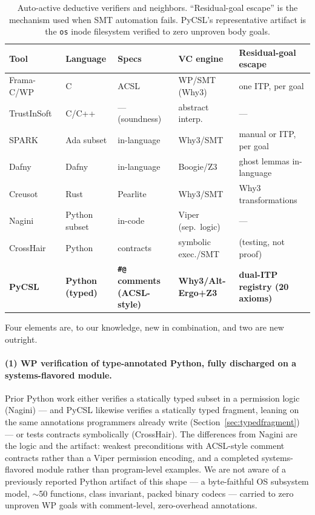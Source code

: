 \documentclass[11pt]{article}
\newcommand{\pycsl}{\textsf{PyCSL}}
\newcommand{\why}{\textsf{Why3}}
\newcommand{\altergo}{\textsf{Alt-Ergo}}
\newcommand{\zthree}{\textsf{Z3}}
\newcommand{\osmod}{\texttt{os}}
\begin{document}
\begin{table}[t]
\centering
\footnotesize
\setlength{\tabcolsep}{4pt}
\renewcommand{\arraystretch}{1.15}
\begin{tabularx}{\textwidth}{@{}l l X l X@{}}
\toprule
Tool & Language & Specs & VC engine & Residual-goal escape \\
\midrule
Frama-C/WP~\cite{framac} & C & ACSL & WP/SMT (\why{}) & one ITP, per goal \\
TrustInSoft~\cite{tis} & C/C++ & --- (soundness) & abstract interp. & --- \\
SPARK~\cite{spark20} & Ada subset & in-language & \why{}/SMT & manual or ITP, per goal \\
Dafny~\cite{dafny} & Dafny & in-language & Boogie/\zthree{} & ghost lemmas in-language \\
Creusot~\cite{creusot} & Rust & Pearlite & \why{}/SMT & \why{} transformations \\
Nagini~\cite{nagini} & Python subset & in-code & Viper (sep.\ logic) & --- \\
CrossHair~\cite{crosshair} & Python & contracts & symbolic exec./SMT & (testing, not proof) \\
\textbf{\pycsl{}} & \textbf{Python (typed)} & \textbf{\texttt{\#@} comments (ACSL-style)} & \textbf{\why{}/\altergo{}+\zthree{}} & \textbf{dual-ITP registry (20 axioms)} \\
\bottomrule
\end{tabularx}
\caption{Auto-active deductive verifiers and neighbors. ``Residual-goal
escape'' is the mechanism used when SMT automation fails. \pycsl{}'s
representative artifact is the \osmod{} inode filesystem verified to zero
unproven body goals.}
\label{tab:compare}
\end{table}

Four elements are, to our knowledge, new in combination, and two are new
outright.

\paragraph{(1) WP verification of type-annotated Python, fully discharged
on a systems-flavored module.}
Prior Python work either verifies a statically typed subset in a permission
logic (Nagini) --- and \pycsl{} likewise verifies a statically typed
fragment, leaning on the same annotations programmers already write
(Section~\ref{sec:typedfragment}) --- or tests contracts symbolically
(CrossHair). The differences from Nagini are the logic and the artifact:
weakest preconditions with ACSL-style comment contracts rather than a Viper
permission encoding, and a completed systems-flavored module rather than
program-level examples. We are not aware of a previously reported Python
artifact of this shape --- a byte-faithful OS
subsystem model, $\sim$50 functions, class invariant, packed binary codecs
--- carried to zero unproven WP goals with comment-level, zero-overhead
annotations.
\end{document}
